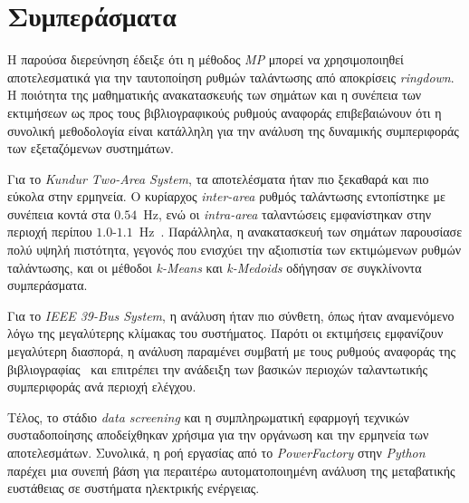 \section{Συμπεράσματα}
Η παρούσα διερεύνηση έδειξε ότι η μέθοδος \textenglish{\textit{MP}} μπορεί να χρησιμοποιηθεί αποτελεσματικά για την ταυτοποίηση ρυθμών ταλάντωσης από αποκρίσεις \textenglish{\textit{ringdown}}. Η ποιότητα της μαθηματικής ανακατασκευής των σημάτων και η συνέπεια των εκτιμήσεων ως προς τους βιβλιογραφικούς ρυθμούς αναφοράς επιβεβαιώνουν ότι η συνολική μεθοδολογία είναι κατάλληλη για την ανάλυση της δυναμικής συμπεριφοράς των εξεταζόμενων συστημάτων.

Για το \textenglish{\textit{Kundur Two-Area System}}, τα αποτελέσματα ήταν πιο ξεκαθαρά και πιο εύκολα στην ερμηνεία. Ο κυρίαρχος \textenglish{\textit{inter-area}} ρυθμός ταλάντωσης εντοπίστηκε με συνέπεια κοντά στα $0.54$~Hz, ενώ οι \textenglish{\textit{intra-area}} ταλαντώσεις εμφανίστηκαν στην περιοχή περίπου $1.0$-$1.1$~Hz~\cite{estimation2021}. Παράλληλα, η ανακατασκευή των σημάτων παρουσίασε πολύ υψηλή πιστότητα, γεγονός που ενισχύει την αξιοπιστία των εκτιμώμενων ρυθμών ταλάντωσης, και οι μέθοδοι \textenglish{\textit{k-Means}} και \textenglish{\textit{k-Medoids}} οδήγησαν σε συγκλίνοντα συμπεράσματα.

Για το \textenglish{\textit{IEEE 39-Bus System}}, η ανάλυση ήταν πιο σύνθετη, όπως ήταν αναμενόμενο λόγω της μεγαλύτερης κλίμακας του συστήματος. Παρότι οι εκτιμήσεις εμφανίζουν μεγαλύτερη διασπορά, η ανάλυση παραμένει συμβατή με τους ρυθμούς αναφοράς της βιβλιογραφίας~\cite{sarkar2024drga} και επιτρέπει την ανάδειξη των βασικών περιοχών ταλαντωτικής συμπεριφοράς ανά περιοχή ελέγχου.

Τέλος, το στάδιο \textenglish{\textit{data screening}} και η συμπληρωματική εφαρμογή τεχνικών συσταδοποίησης αποδείχθηκαν χρήσιμα για την οργάνωση και την ερμηνεία των αποτελεσμάτων. Συνολικά, η ροή εργασίας από το \textenglish{\textit{PowerFactory}} στην \textenglish{\textit{Python}} παρέχει μια συνεπή βάση για περαιτέρω αυτοματοποιημένη ανάλυση της μεταβατικής ευστάθειας σε συστήματα ηλεκτρικής ενέργειας.

\FloatBarrier

